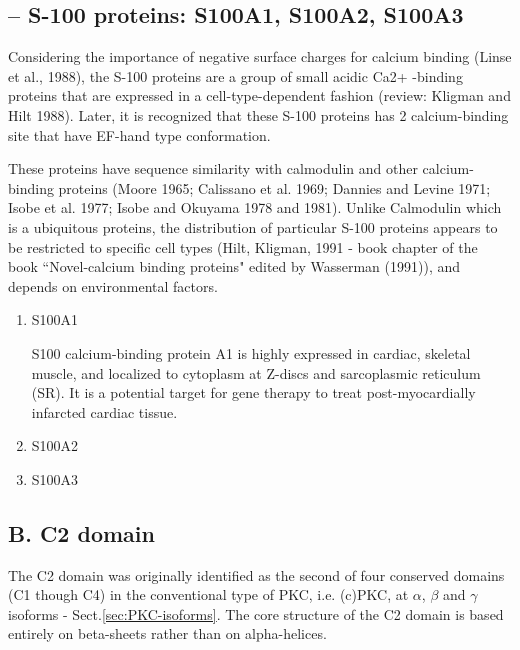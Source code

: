 \subsection{-- S-100 proteins: S100A1, S100A2, S100A3}
\label{sec:calcium-binding-proteins-acidic-region}
\label{sec:S100A}

Considering the importance of negative surface charges for calcium binding
(Linse et al., 1988), the S-100 proteins are a group of small acidic Ca2+
-binding proteins that are expressed in a cell-type-dependent fashion (review:
Kligman and Hilt 1988). Later, it is recognized that these S-100 proteins has 2
calcium-binding site that have EF-hand type conformation.

These proteins have sequence similarity with calmodulin and other
calcium-binding proteins (Moore 1965; Calissano et al. 1969; Dannies and Levine
1971; Isobe et al. 1977; Isobe and Okuyama 1978 and 1981). Unlike Calmodulin
which is a ubiquitous proteins, the distribution of particular S-100 proteins
appears to be restricted to specific cell types (Hilt, Kligman, 1991 - book
chapter of the book ``Novel-calcium binding proteins" edited by Wasserman
(1991)), and depends on environmental factors.
\begin{enumerate}
  \item S100A1

S100 calcium-binding protein A1 is highly expressed in cardiac, skeletal muscle,
and localized to cytoplasm at Z-discs and sarcoplasmic reticulum (SR).
It is a potential target for gene therapy to treat post-myocardially infarcted
cardiac tissue.

  \item S100A2

  \item S100A3

\end{enumerate}




\subsection{B. C2 domain}
\label{sec:calcium-binding-proteins-C2-domain} 

The C2 domain was originally identified as the second of four conserved domains
(C1 though C4) in the conventional type of PKC, i.e. (c)PKC, at $\alpha$,
$\beta$ and $\gamma$ isoforms - Sect.\ref{sec:PKC-isoforms}.
The core structure of the C2 domain is based entirely on beta-sheets rather than
on alpha-helices.

